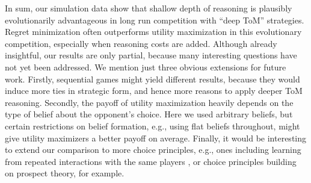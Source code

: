\documentclass[10pt]{article}
\begin{document}
In sum, our simulation data show that shallow depth of reasoning is
plausibly evolutionarily advantageous in long run competition with
``deep ToM'' strategies. Regret minimization often outperforms utility
maximization in this evolutionary competition, especially when
reasoning costs are added. Although already insightful, our results
are only partial, because many interesting questions have not yet been
addressed. We mention just three obvious extensions for future
work. Firstly, sequential games might yield different results, because
they would induce more ties in strategic form, and hence more reasons
to apply deeper ToM reasoning. Secondly, the payoff of utility
maximization heavily depends on the type of belief about the
opponent's choice. Here we used arbitrary beliefs, but certain
restrictions on belief formation, e.g., using flat beliefs throughout,
might give utility maximizers a better payoff on average. Finally, it
would be interesting to extend our comparison to more choice
principles, e.g., ones including learning from repeated interactions
with the same players
\citep[][]{Weerdde-WeerdVerbrugge2013:How-much-does-i}, or choice
principles building on prospect theory, for example.

\newpage

\printbibliography[heading=bibintoc]
\end{document}
